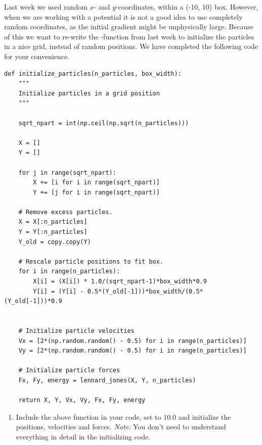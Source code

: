 \documentclass{article}
\begin{document}
Last week we used random $x$- and $y$-coordinates, within a (-10, 10) box.
However, when we are working with a potential it is not a good idea to use completely random coordinates, as the initial gradient might be unphysically large.
Because of this we want to re-write the -function from last week to initialize the particles in a nice grid, instead of random positions.
We have completed the following code for your convenience.

\begin{lstlisting}
def initialize_particles(n_particles, box_width):
    """
    Initialize particles in a grid position
    """

    sqrt_npart = int(np.ceil(np.sqrt(n_particles)))

    X = []
    Y = []

    for j in range(sqrt_npart):
        X += [i for i in range(sqrt_npart)]
        Y += [j for i in range(sqrt_npart)]

    # Remove excess particles.
    X = X[:n_particles]
    Y = Y[:n_particles]
    Y_old = copy.copy(Y)
    
    # Rescale particle positions to fit box.
    for i in range(n_particles):
        X[i] = (X[i]) * 1.0/(sqrt_npart-1)*box_width*0.9
        Y[i] = (Y[i] - 0.5*(Y_old[-1]))*box_width/(0.5*(Y_old[-1]))*0.9
    

    # Initialize particle velocities
    Vx = [2*(np.random.random() - 0.5) for i in range(n_particles)]
    Vy = [2*(np.random.random() - 0.5) for i in range(n_particles)]

    # Initialize particle forces
    Fx, Fy, energy = lennard_jones(X, Y, n_particles)

    return X, Y, Vx, Vy, Fx, Fy, energy

\end{lstlisting}

\begin{enumerate}[resume]
    \item Include the above  function in your code, set  to 10.0 and initialize the positions, velocities and forces.
    {\em Note:} You don't need to understand everything in detail in the initializing code.
\end{enumerate}
\end{document}

